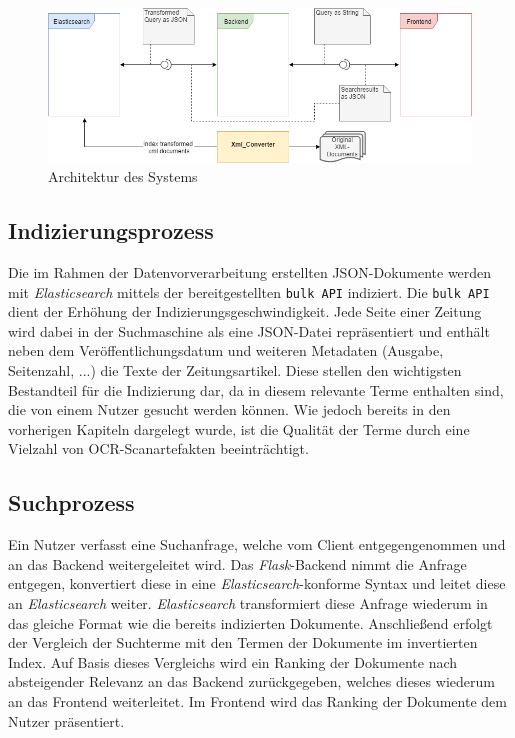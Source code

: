 \documentclass[11pt,a4paper, halfparskip]{scrartcl}
\begin{document}
\begin{figure}[h]
	\includegraphics[width=\linewidth]{images/Architektur.png}
	\caption{Architektur des Systems}
\end{figure}

\subsection{Indizierungsprozess}

Die im Rahmen der Datenvorverarbeitung erstellten JSON-Dokumente werden mit \textit{Elasticsearch} mittels der bereitgestellten \texttt{bulk API} indiziert.
Die \texttt{bulk API} dient der Erhöhung der Indizierungsgeschwindigkeit.
Jede Seite einer Zeitung wird dabei in der Suchmaschine als eine JSON-Datei repräsentiert und enthält neben dem Veröffentlichungsdatum und weiteren Metadaten (Ausgabe, Seitenzahl, ...) die Texte der Zeitungsartikel.
Diese stellen den wichtigsten Bestandteil für die Indizierung dar, da in diesem relevante Terme enthalten sind, die von einem Nutzer gesucht werden können.
Wie jedoch bereits in den vorherigen Kapiteln dargelegt wurde, ist die Qualität der Terme durch eine Vielzahl von OCR-Scanartefakten beeinträchtigt.

\subsection{Suchprozess}

Ein Nutzer verfasst eine Suchanfrage, welche vom Client entgegengenommen und an das Backend weitergeleitet wird.
Das \textit{Flask}-Backend nimmt die Anfrage entgegen, konvertiert diese in eine \textit{Elasticsearch}-konforme Syntax und leitet diese an \textit{Elasticsearch} weiter.
\textit{Elasticsearch} transformiert diese Anfrage wiederum in das gleiche Format wie die bereits indizierten Dokumente.
Anschließend erfolgt der Vergleich der Suchterme mit den Termen der Dokumente im invertierten Index.
Auf Basis dieses Vergleichs wird ein Ranking der Dokumente nach absteigender Relevanz an das Backend zurückgegeben, welches dieses wiederum an das Frontend weiterleitet.
Im Frontend wird das Ranking der Dokumente dem Nutzer präsentiert.
\end{document}
